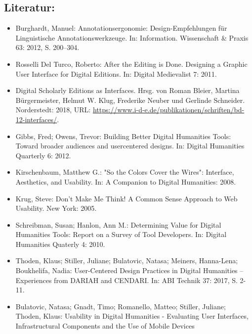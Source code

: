 \documentclass{article}
\begin{document}
        \subsection*{Literatur:}\begin{itemize}\item Burghardt, Manuel: Annotationsergonomie: Design-Empfehlungen für
                              Linguistische Annotationswerkzeuge. In: Information. Wissenschaft & Praxis 63: 2012, S. 200–304.\item Rosselli Del Turco, Roberto: After the Editing is Done. Designing a Graphic User
                              Interface for Digital Editions. In: Digital Medievalist 7: 2011.\item Digital Scholarly Editions as Interfaces. Hrsg. von Roman Bleier, Martina Bürgermeister, Helmut W. Klug, Frederike Neuber und Gerlinde Schneider. Norderstedt: 2018, URL: \url{https://www.i-d-e.de/publikationen/schriften/bd-12-interfaces/}.\item Gibbs, Fred; Owens, Trevor: Building Better Digital Humanities Tools: Toward broader
                              audiences and user­centered designs. In: Digital Humanities Quarterly 6: 2012.\item Kirschenbaum, Matthew G.: "So the Colors Cover the Wires": Interface, Aesthetics,
                              and Usability. In: A Companion to Digital Humanities: 2008.\item Krug, Steve: Don't Make Me Think! A Common Sense Approach to Web
                              Usability. New York: 2005.\item Schreibman, Susan; Hanlon, Ann M.: Determining Value for Digital Humanities Tools: Report
                              on a Survey of Tool Developers. In: Digital Humanities Quaterly 4: 2010.\item Thoden, Klaus; Stiller, Juliane; Bulatovic, Natasa; Meiners, Hanna-Lena; Boukhelifa, Nadia: User-Centered Design Practices in Digital Humanities –
                              Experiences from DARIAH and CENDARI. In: ABI Technik 37: 2017, S. 2-11.\item Bulatovic, Natasa; Gnadt, Timo; Romanello, Matteo; Stiller, Juliane; Thoden, Klaus: Usability in Digital Humanities - Evaluating User
                              Interfaces, Infrastructural Components and the Use of Mobile Devices

\end{itemize}
\end{document}
